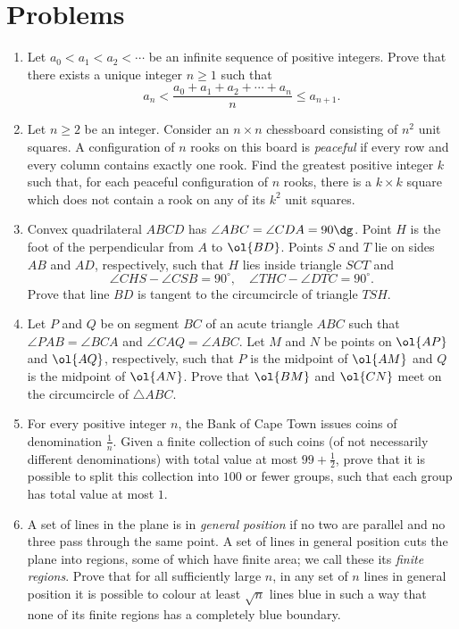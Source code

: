 \documentclass[11pt]{scrartcl}
\begin{document}
\section{Problems}
\begin{enumerate}[\bfseries 1.]
\item %
Let $a_0 < a_1 < a_2 < \dotsb$ be an infinite sequence of positive integers.
Prove that there exists a unique integer $n\geq 1$ such that
\[ a_n < \frac{a_0+a_1+a_2+\dotsb+a_n}{n} \le a_{n+1}. \]

\item %
Let $n \ge 2$ be an integer.
Consider an $n \times n$ chessboard consisting of $n^2$ unit squares.
A configuration of $n$ rooks on this board is \emph{peaceful}
if every row and every column contains exactly one rook.
Find the greatest positive integer $k$ such that,
for each peaceful configuration of $n$ rooks,
there is a $k \times k$ square which does not
contain a rook on any of its $k^2$ unit squares.

\item %
Convex quadrilateral $ABCD$ has $\angle ABC = \angle CDA = 90\dg$.
Point $H$ is the foot of the perpendicular from $A$ to $\ol{BD}$.
Points $S$ and $T$ lie on sides $AB$ and $AD$,
respectively, such that $H$ lies inside triangle $SCT$ and
\[ \angle CHS - \angle CSB = 90^{\circ},
  \quad \angle THC - \angle DTC = 90^{\circ}. \]
Prove that line $BD$ is tangent to the circumcircle of triangle $TSH$.

\item %
Let $P$ and $Q$ be on segment $BC$ of an acute triangle $ABC$
such that $\angle PAB=\angle BCA$ and $\angle CAQ=\angle ABC$.
Let $M$ and $N$ be points on $\ol{AP}$ and $\ol{AQ}$,
respectively, such that $P$ is the midpoint of $\ol{AM}$
and $Q$ is the midpoint of $\ol{AN}$.
Prove that $\ol{BM}$ and $\ol{CN}$ meet on the
circumcircle of $\triangle ABC$.

\item %
For every positive integer $n$,
the Bank of Cape Town issues coins of denomination $\frac 1n$.
Given a finite collection of such coins (of not necessarily different denominations)
with total value at most $99 + \frac12$, prove that it is possible to split
this collection into $100$ or fewer groups, such that each group has total value at most $1$.

\item %
A set of lines in the plane is in \emph{general position}
if no two are parallel and no three pass through the same point.
A set of lines in general position cuts the plane into regions,
some of which have finite area; we call these its \emph{finite regions}.
Prove that for all sufficiently large $n$,
in any set of $n$ lines in general position
it is possible to colour at least $\sqrt{n}$ lines blue
in such a way that none of its finite regions
has a completely blue boundary.

\end{enumerate}
\pagebreak
\end{document}
